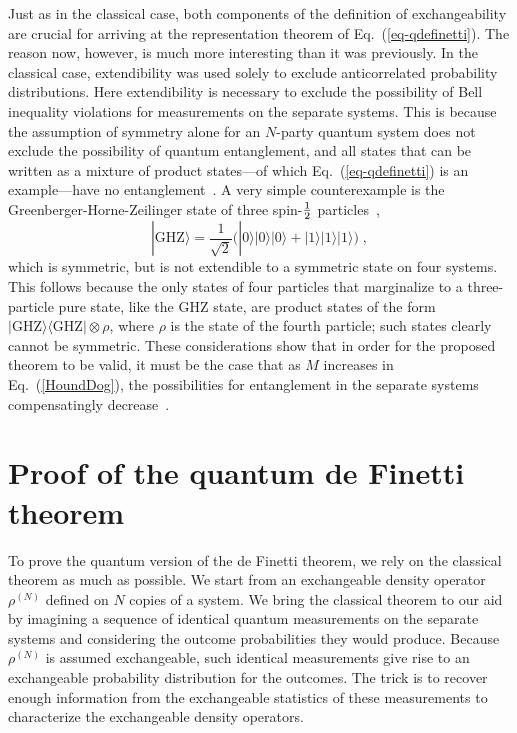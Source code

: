 \documentclass[12pt,aps,eqsecnum]{revtex4-1}
\begin{document}
Just as in the classical case, both components of the definition
of exchangeability are crucial for arriving at the representation
theorem of Eq.~(\ref{eq-qdefinetti}).  The reason now, however, is
much more interesting than it was previously.  In the classical
case, extendibility was used solely to exclude anticorrelated
probability distributions. Here extendibility is necessary to
exclude the possibility of Bell inequality violations for
measurements on the separate systems. This is because the
assumption of symmetry alone for an $N$-party quantum system does
not exclude the possibility of quantum entanglement, and all
states that can be written as a mixture of product states---of
which Eq.~(\ref{eq-qdefinetti}) is an example---have no
entanglement~\cite{Bennett1996}. A very simple counterexample is
the Greenberger-Horne-Zeilinger state of three spin-$1\over2$
particles~\cite{Mermin1990},
\begin{equation}
|\mbox{GHZ}\rangle=\frac{1}{\sqrt{2}}\Big(|0\rangle|0\rangle|0\rangle+
|1\rangle|1\rangle|1\rangle\Big)\;,
\end{equation}
which is symmetric, but is not extendible to a symmetric state on
four systems.  This follows because the only states of four
particles that marginalize to a three-particle pure state, like
the GHZ state, are product states of the form
$|\mbox{GHZ}\rangle\langle\mbox{GHZ}|\otimes\rho$, where $\rho$ is
the state of the fourth particle; such states clearly cannot be
symmetric.  These considerations show that in order for the
proposed theorem to be valid, it must be the case that as $M$
increases in Eq.~(\ref{HoundDog}), the possibilities for
entanglement in the separate systems compensatingly
decrease~\cite{Koashi2000}.

\section{Proof of the quantum de Finetti theorem} \label{sec-proof}

To prove the quantum version of the de Finetti theorem, we rely on
the classical theorem as much as possible.  We start from an
exchangeable density operator $\rho^{(N)}$ defined on $N$ copies
of a system.  We bring the classical theorem to our aid by
imagining a sequence of identical quantum measurements on the
separate systems and considering the outcome probabilities they
would produce.  Because $\rho^{(N)}$ is assumed exchangeable, such
identical measurements give rise to an exchangeable probability
distribution for the outcomes.  The trick is to recover enough
information from the exchangeable statistics of these measurements
to characterize the exchangeable density operators.
\end{document}
